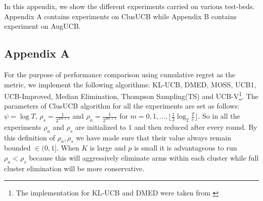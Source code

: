 In this appendix, we show the different experiments carried on various test-beds. Appendix A contains experiments on ClusUCB while Appendix B contains experiment on AugUCB.

\subsection*{Appendix A}
\label{AppendixA}
For the purpose of performance comparison using cumulative regret as the metric, we implement the following algorithms:  KL-UCB\cite{garivier2011kl}, DMED\cite{honda2010asymptotically}, MOSS\cite{audibert2009minimax}, UCB1\cite{auer2002finite}, UCB-Improved\cite{auer2010ucb}, Median Elimination\cite{even2006action}, Thompson Sampling(TS)\cite{agrawal2011analysis} and UCB-V\cite{audibert2009exploration}\footnote{The implementation for KL-UCB and DMED were taken from \cite{CapGarKau12}}. The parameters of ClusUCB algorithm for all the experiments are set as follows: $\psi=\log T$, $\rho_{s}=\frac{1}{2^{2m+1}}$ and $\rho_{a}=\frac{1}{2^{4m+1}}$ for $m=0,1,..., \lfloor \frac{1}{2}\log_{2} \frac{T}{e}\rfloor$. So in all the experiments $\rho_{a}$ and $\rho_{s}$ are initialized to $1$ and then reduced after every round. By this definition of $\rho_{a},\rho_{s}$ we have made sure that their value always remain bounded $\in(0,1]$. When $K$ is large and $p$ is small it is advantageous to run $\rho_{a} < \rho_{s}$ because this will aggressively eliminate arms within each cluster while full cluster elimination will be more conservative. 

